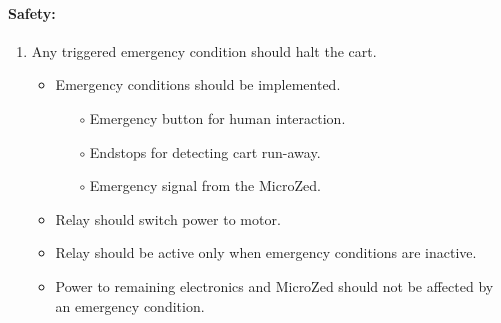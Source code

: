 \paragraph{Safety:}
\begin{enumerate}[resume]
	\item Any triggered emergency condition should halt the cart.
	\label{enum:any_trigger_em}
		\begin{itemize}
			\item Emergency conditions should be implemented.
			\begin{itemize}
				\item[$\circ$] Emergency button for human interaction.
				\item[$\circ$] Endstops for detecting cart run-away.
				\item[$\circ$] Emergency signal from the MicroZed.
			\end{itemize}
			\item Relay should switch power to motor.
			\item Relay should be active only when emergency conditions are inactive.
			\item Power to remaining electronics and MicroZed should not be affected by an emergency condition.
		\end{itemize}
\end{enumerate}
